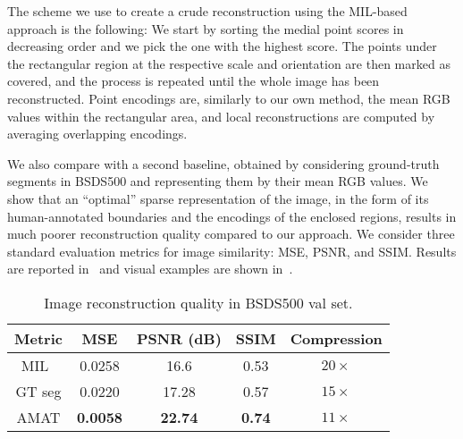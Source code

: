 \documentclass[10pt,twocolumn,letterpaper]{article}
\begin{document}
The scheme we use to create a crude reconstruction using the MIL-based approach is the following:
We start by sorting the medial point scores in decreasing order and we pick the one with the highest score.
The points under the rectangular region at the respective scale and orientation are then marked as covered,
and the process is repeated until the whole image has been reconstructed.
Point encodings are, similarly to our own method, the mean RGB values within the rectangular area, 
and local reconstructions are computed by averaging overlapping encodings.

We also compare with a second baseline, obtained by considering ground-truth segments in BSDS500
and representing them by their mean RGB values.
We show that an ``optimal'' sparse representation of the image, in the form of its human-annotated
boundaries and the encodings of the enclosed regions, results in much poorer reconstruction
quality compared to our approach.
We consider three standard evaluation metrics for image similarity: MSE, PSNR, and SSIM.
Results are reported in~ and visual examples are shown
in~.


\begin{table}
\centering
\begin{tabular}{|c|c|c|c|c|}
\hline
Metric	&	MSE		&	PSNR (dB)	&	SSIM	&	Compression 	\\
\hline
MIL~\cite{tsogkas2012learning}	&	0.0258	& 	16.6 	& 	0.53	&	$20\times$	\\
\hline
GT seg &	0.0220	& 	17.28 	& 	0.57	&	$15\times$\\
\hline
AMAT	&	\textbf{0.0058}	&	\textbf{22.74}	&	\textbf{0.74}	&	$11\times$	\\
\hline
\end{tabular}
\caption{Image reconstruction quality in BSDS500 val set.}
\label{tab:experiments:reconstruction}
\end{table}
\end{document}
